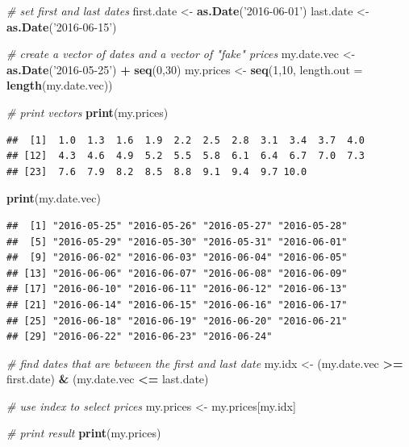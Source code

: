 \documentclass[11pt,]{book}
\newenvironment{Shaded}{\begin{snugshade}}{\end{snugshade}}
\newcommand{\KeywordTok}[1]{\textcolor[rgb]{0.27,0.27,0.27}{\textbf{#1}}}
\newcommand{\DataTypeTok}[1]{\textcolor[rgb]{0.27,0.27,0.27}{#1}}
\newcommand{\DecValTok}[1]{\textcolor[rgb]{0.06,0.06,0.06}{#1}}
\newcommand{\StringTok}[1]{\textcolor[rgb]{0.5,0.5,0.5}{#1}}
\newcommand{\CommentTok}[1]{\textcolor[rgb]{0.56,0.35,0.01}{\textit{#1}}}
\newcommand{\OperatorTok}[1]{\textcolor[rgb]{0.81,0.36,0.00}{\textbf{#1}}}
\newcommand{\NormalTok}[1]{#1}
\begin{document}
\begin{Shaded}
\begin{Highlighting}[]
\CommentTok{# set first and last dates}
\NormalTok{first.date <-}\StringTok{ }\KeywordTok{as.Date}\NormalTok{(}\StringTok{'2016-06-01'}\NormalTok{)}
\NormalTok{last.date <-}\StringTok{ }\KeywordTok{as.Date}\NormalTok{(}\StringTok{'2016-06-15'}\NormalTok{)}

\CommentTok{# create a vector of dates and a vector of "fake" prices}
\NormalTok{my.date.vec <-}\StringTok{ }\KeywordTok{as.Date}\NormalTok{(}\StringTok{'2016-05-25'}\NormalTok{) }\OperatorTok{+}\StringTok{ }\KeywordTok{seq}\NormalTok{(}\DecValTok{0}\NormalTok{,}\DecValTok{30}\NormalTok{)}
\NormalTok{my.prices <-}\StringTok{ }\KeywordTok{seq}\NormalTok{(}\DecValTok{1}\NormalTok{,}\DecValTok{10}\NormalTok{, }\DataTypeTok{length.out =} \KeywordTok{length}\NormalTok{(my.date.vec))}

\CommentTok{# print vectors }
\KeywordTok{print}\NormalTok{(my.prices)}
\end{Highlighting}
\end{Shaded}

\begin{verbatim}
##  [1]  1.0  1.3  1.6  1.9  2.2  2.5  2.8  3.1  3.4  3.7  4.0
## [12]  4.3  4.6  4.9  5.2  5.5  5.8  6.1  6.4  6.7  7.0  7.3
## [23]  7.6  7.9  8.2  8.5  8.8  9.1  9.4  9.7 10.0
\end{verbatim}

\begin{Shaded}
\begin{Highlighting}[]
\KeywordTok{print}\NormalTok{(my.date.vec)}
\end{Highlighting}
\end{Shaded}

\begin{verbatim}
##  [1] "2016-05-25" "2016-05-26" "2016-05-27" "2016-05-28"
##  [5] "2016-05-29" "2016-05-30" "2016-05-31" "2016-06-01"
##  [9] "2016-06-02" "2016-06-03" "2016-06-04" "2016-06-05"
## [13] "2016-06-06" "2016-06-07" "2016-06-08" "2016-06-09"
## [17] "2016-06-10" "2016-06-11" "2016-06-12" "2016-06-13"
## [21] "2016-06-14" "2016-06-15" "2016-06-16" "2016-06-17"
## [25] "2016-06-18" "2016-06-19" "2016-06-20" "2016-06-21"
## [29] "2016-06-22" "2016-06-23" "2016-06-24"
\end{verbatim}

\begin{Shaded}
\begin{Highlighting}[]
\CommentTok{# find dates that are between the first and last date}
\NormalTok{my.idx <-}\StringTok{ }\NormalTok{(my.date.vec }\OperatorTok{>=}\StringTok{ }\NormalTok{first.date) }\OperatorTok{&}\StringTok{ }\NormalTok{(my.date.vec }\OperatorTok{<=}\StringTok{ }\NormalTok{last.date)}

\CommentTok{# use index to select prices}
\NormalTok{my.prices <-}\StringTok{ }\NormalTok{my.prices[my.idx]}

\CommentTok{# print result}
\KeywordTok{print}\NormalTok{(my.prices)}
\end{Highlighting}
\end{Shaded}
\end{document}
